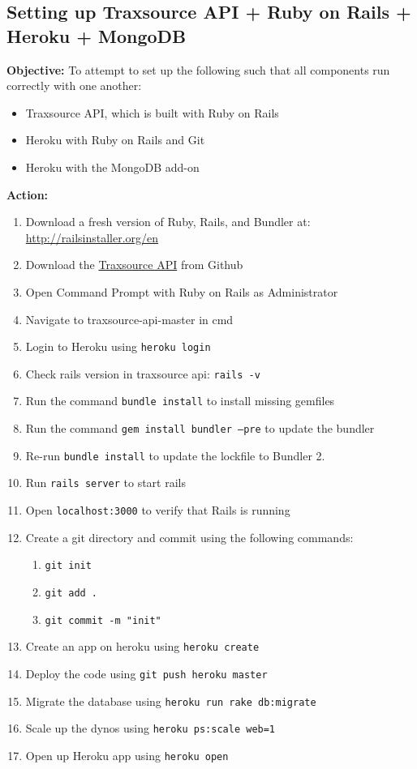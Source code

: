 \documentclass{article}
\begin{document}
\subsection{Setting up Traxsource API + Ruby on Rails + Heroku + MongoDB}
\textbf{Objective:} To attempt to set up the following such that all components run correctly with one another:
\begin{itemize}
    \item Traxsource API, which is built with Ruby on Rails
    \item Heroku with Ruby on Rails and Git
    \item Heroku with the MongoDB add-on
\end{itemize}
\textbf{Action:}
\begin{enumerate}
    \item Download a fresh version of Ruby, Rails, and Bundler at:\\ \url{http://railsinstaller.org/en}
    \item Download the \hyperlink{https://github.com/janosrusiczki/traxsource-api}{Traxsource API} from Github
    \item Open Command Prompt with Ruby on Rails as Administrator
    \item Navigate to traxsource-api-master in cmd
    \item Login to Heroku using \texttt{heroku login}
    \item Check rails version in traxsource api: \texttt{rails -v}
    \item Run the command \texttt{bundle install} to install missing gemfiles
    \item Run the command \texttt{gem install bundler --pre} to update the bundler
    \item Re-run \texttt{bundle install} to update the lockfile to Bundler 2.
    \item Run \texttt{rails server} to start rails
    \item Open \texttt{localhost:3000} to verify that Rails is running
    \item Create a git directory and commit using the following commands:
    \begin{enumerate}
        \item \texttt{git init}
        \item \texttt{git add .}
        \item \texttt{git commit -m "init"}
    \end{enumerate}
    \item Create an app on heroku using \texttt{heroku create}
    \item Deploy the code using \texttt{git push heroku master}
    \item Migrate the database using \texttt{heroku run rake db:migrate}
    \item Scale up the dynos using \texttt{heroku ps:scale web=1}
    \item Open up Heroku app using \texttt{heroku open}
\end{enumerate}
\end{document}
